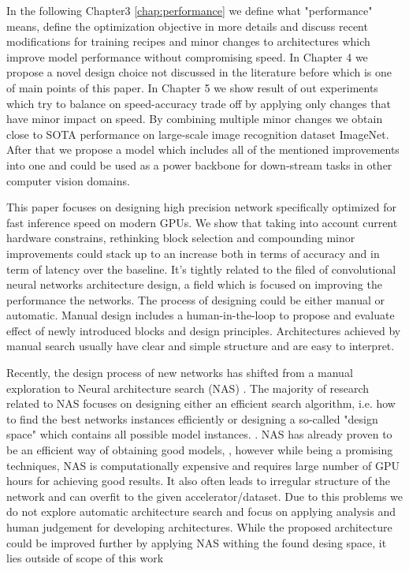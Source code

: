 In the following Chapter3 \ref{chap:performance} we define what "performance" means, define the optimization objective in more details and discuss recent modifications for training recipes and minor changes to architectures which improve model performance without compromising speed. In Chapter 4 we propose a novel design choice not discussed in the literature before which is one of main points of this paper. In Chapter 5 we show result of out experiments which try to balance on speed-accuracy trade off by applying only changes that have minor impact on speed. By combining multiple minor changes we obtain close to SOTA performance on large-scale image recognition dataset ImageNet. After that we propose a model which includes all of the mentioned improvements into one and could be used as a power backbone for down-stream tasks in other computer vision domains.

This paper focuses on designing high precision network specifically optimized for fast inference speed on modern GPUs. We show that taking into account current hardware constrains, rethinking block selection and compounding minor improvements could stack up to an increase both in terms of accuracy and in term of latency over the baseline. It's tightly related to the filed of convolutional neural networks architecture design, a field which is focused on improving the performance the networks. The process of designing could be either manual or automatic. Manual design includes a human-in-the-loop to propose and evaluate effect of newly introduced blocks and design principles. Architectures achieved by manual search usually have clear and simple structure and are easy to interpret. 

Recently, the design process of new networks has shifted from a manual exploration to Neural architecture search (NAS) \cite{real2019_nas1}. The majority of research related to NAS focuses on designing either an efficient search algorithm, i.e. how to find the best networks instances efficiently \cite{zoph2018_nasnet} \cite{pham2018_nas_efficient} or designing a so-called "design space" which contains all possible model instances. \cite{radosavovic2020_designing} \cite{liu2018_nas_progressive}. NAS has already proven to be an efficient way of obtaining good models, \cite{tan2019_efficientnet} \cite{lin2020neural_genet} \cite{pham2018_nas_efficient}, however while being a promising techniques, NAS is computationally expensive and requires large number of GPU hours for achieving good results. It also often leads to irregular structure of the network and can overfit to the given accelerator/dataset. Due to this problems we do not explore automatic architecture search and focus on applying analysis and human judgement for developing architectures. While the proposed architecture could be improved further by applying NAS withing the found desing space, it lies outside of scope of this work




